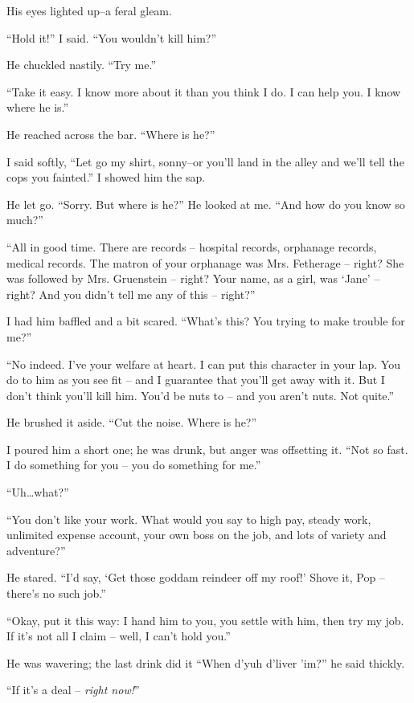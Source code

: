 His eyes lighted up--a feral gleam.

``Hold it!'' I said. ``You wouldn't kill him?''

He chuckled nastily. ``Try me.''

``Take  it  easy. I know more about it than you think I
do. I can help you. I know where he is.''

He reached across the bar. ``Where is he?''

I said softly, ``Let go my shirt, sonny--or  you'll  land
in  the  alley and we'll tell the cops you fainted.'' I showed
him the sap.

He let go. ``Sorry. But where is he?'' He looked  at
me. ``And how do you know so much?''

``All  in  good  time.  There  are  records  --  hospital
records, orphanage records, medical records. The matron of your
orphanage was Mrs. Fetherage -- right? She was followed by  Mrs.
Gruenstein  --  right? Your name, as a girl, was `Jane' -- right?
And you didn't tell me any of this -- right?''

I had him baffled and a bit scared. ``What's this? You
trying to make trouble for me?''

``No indeed. I've your welfare at heart. I can put  this
character  in  your  lap.  You do to him as you see fit -- and I
guarantee that you'll get away  with  it.  But  I  don't  think
you'll  kill  him.  You'd be nuts to -- and you aren't nuts. Not
quite.''

He brushed it aside. ``Cut the noise. Where is he?''

I poured him a short one; he was drunk, but  anger  was
offsetting  it. ``Not so fast. I do something for you -- you do
something for me.''

``Uh\dots what?''

``You don't like your work. What would you say  to  high
pay,  steady  work, unlimited expense account, your own boss on
the job, and lots of variety and adventure?''

He stared. ``I'd say, `Get those goddam  reindeer  off
my roof!' Shove it, Pop -- there's no such job.''

``Okay, put  it this way: I hand him to you, you settle
with him, then try my job. If it's not all I claim  -- well,  I
can't hold you.''

He  was  wavering;  the  last  drink did it ``When d'yuh
d'liver 'im?'' he said thickly.

``If it's a deal -- \emph{right now!}''

